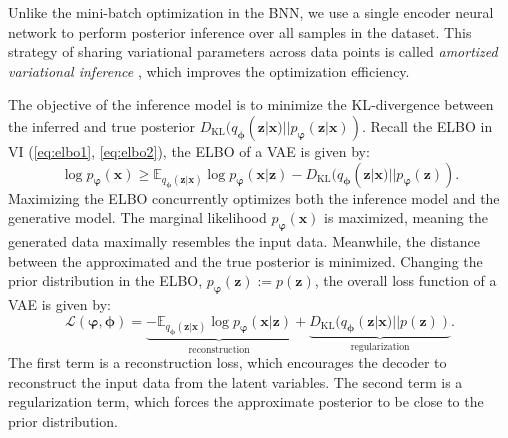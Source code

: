 Unlike the mini-batch optimization in the \ac{BNN}, we use a single encoder neural network to perform posterior inference over all samples in the dataset. This strategy of sharing variational parameters across data points is called \textit{amortized variational inference} \citep{gershman2014amortized, margossian2024amortized}, which improves the optimization efficiency. 

The objective of the inference model is to minimize the \ac{KL}-divergence between the inferred and true posterior $D_{\text{KL}}(q_{\boldsymbol{\phi}}(\boldsymbol{z}|\boldsymbol{x})||p_{\boldsymbol{\varphi}}(\boldsymbol{z}|\boldsymbol{x}))$. Recall the \ac{ELBO} in \ac{VI} (\ref{eq:elbo1}, \ref{eq:elbo2}), the \ac{ELBO} of a \ac{VAE} is given by:
\begin{equation}
    \log p_{\boldsymbol{\varphi}}(\boldsymbol{x}) \geq \mathbb{E}_{q_{\boldsymbol{\phi}}(\boldsymbol{z}|\boldsymbol{x})}\log p_{\boldsymbol{\varphi}}(\boldsymbol{x}|\boldsymbol{z}) - D_{\text{KL}}(q_{\boldsymbol{\phi}}(\boldsymbol{z}|\boldsymbol{x})||p_{\boldsymbol{\varphi}}(\boldsymbol{z})).
\end{equation}
Maximizing the \ac{ELBO} concurrently optimizes both the inference model and the generative model. The marginal likelihood $p_{\boldsymbol{\varphi}}(\boldsymbol{x})$ is maximized, meaning the generated data maximally resembles the input data. Meanwhile, the distance between the approximated and the true posterior is minimized. 
Changing the prior distribution in the \ac{ELBO}, $p_{\boldsymbol{\varphi}}(\boldsymbol{z}):=p(\boldsymbol{z})$, the overall loss function of a \ac{VAE} is given by:
\begin{equation}
    \mathcal{L}(\boldsymbol{\varphi}, \boldsymbol{\phi}) = \underbrace{-\mathbb{E}_{q_{\boldsymbol{\phi}}(\boldsymbol{z}|\boldsymbol{x})}\log p_{\boldsymbol{\varphi}}(\boldsymbol{x}|\boldsymbol{z})}_{\text{reconstruction}} + \underbrace{D_{\text{KL}}(q_{\boldsymbol{\phi}}(\boldsymbol{z}|\boldsymbol{x})||p(\boldsymbol{z}))}_{\text{regularization}}.
\end{equation}
The first term is a reconstruction loss, which encourages the decoder to reconstruct the input data from the latent variables. The second term is a regularization term, which forces the approximate posterior to be close to the prior distribution.


